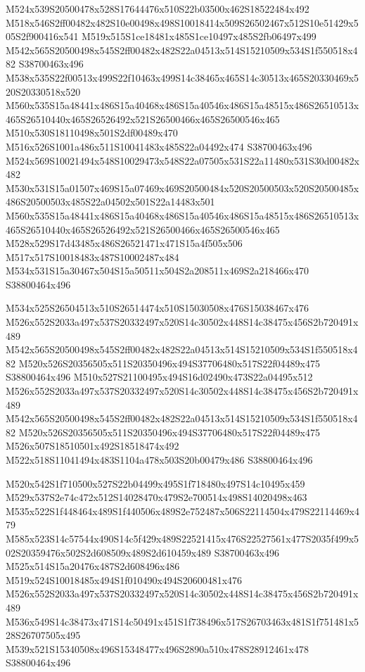 \documentclass{article}
\begin{document}
\begin{multicols}{2}
M524x539S20500478x528S17644476x510S22b03500x462S18522484x492 M518x546S2ff00482x482S10e00498x498S10018414x509S26502467x512S10e51429x505S2f900416x541 M519x515S1ce18481x485S1ce10497x485S2fb06497x499 M542x565S20500498x545S2ff00482x482S22a04513x514S15210509x534S1f550518x482 S38700463x496 M538x535S22f00513x499S22f10463x499S14c38465x465S14c30513x465S20330469x520S20330518x520 M560x535S15a48441x486S15a40468x486S15a40546x486S15a48515x486S26510513x465S26510440x465S26526492x521S26500466x465S26500546x465 M510x530S18110498x501S2df00489x470 M516x526S1001a486x511S10041483x485S22a04492x474 S38700463x496 M524x569S10021494x548S10029473x548S22a07505x531S22a11480x531S30d00482x482 M530x531S15a01507x469S15a07469x469S20500484x520S20500503x520S20500485x486S20500503x485S22a04502x501S22a14483x501 M560x535S15a48441x486S15a40468x486S15a40546x486S15a48515x486S26510513x465S26510440x465S26526492x521S26500466x465S26500546x465 M528x529S17d43485x486S26521471x471S15a4f505x506 M517x517S10018483x487S10002487x484 M534x531S15a30467x504S15a50511x504S2a208511x469S2a218466x470 S38800464x496

M534x525S26504513x510S26514474x510S15030508x476S15038467x476 M526x552S2033a497x537S20332497x520S14c30502x448S14c38475x456S2b720491x489 M542x565S20500498x545S2ff00482x482S22a04513x514S15210509x534S1f550518x482 M520x526S20356505x511S20350496x494S37706480x517S22f04489x475 S38800464x496 M510x527S21100495x494S16d02490x473S22a04495x512 M526x552S2033a497x537S20332497x520S14c30502x448S14c38475x456S2b720491x489 M542x565S20500498x545S2ff00482x482S22a04513x514S15210509x534S1f550518x482 M520x526S20356505x511S20350496x494S37706480x517S22f04489x475 M526x507S18510501x492S18518474x492 M522x518S11041494x483S1104a478x503S20b00479x486 S38800464x496

M520x542S1f710500x527S22b04499x495S1f718480x497S14c10495x459 M529x537S2e74c472x512S14028470x479S2e700514x498S14020498x463 M535x522S1f448464x489S1f440506x489S2e752487x506S22114504x479S22114469x479 M585x523S14c57544x490S14c5f429x489S22521415x476S22527561x477S2035f499x502S20359476x502S2d608509x489S2d610459x489 S38700463x496 M525x514S15a20476x487S2d608496x486 M519x524S10018485x494S1f010490x494S20600481x476 M526x552S2033a497x537S20332497x520S14c30502x448S14c38475x456S2b720491x489 M536x549S14c38473x471S14c50491x451S1f738496x517S26703463x481S1f751481x528S26707505x495 M539x521S15340508x496S15348477x496S2890a510x478S28912461x478 S38800464x496


\end{multicols}
\end{document}
